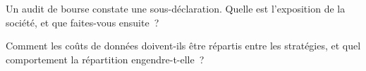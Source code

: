 \begin{interviewq}\label{iq:fm:data-strategy-and-costs:5}
Un audit de bourse constate une sous-déclaration. Quelle est l'exposition de la société, et que faites-vous ensuite~?
\end{interviewq}

\begin{interviewq}\label{iq:fm:data-strategy-and-costs:6}
Comment les coûts de données doivent-ils être répartis entre les stratégies, et quel comportement la répartition engendre-t-elle~?
\end{interviewq}
